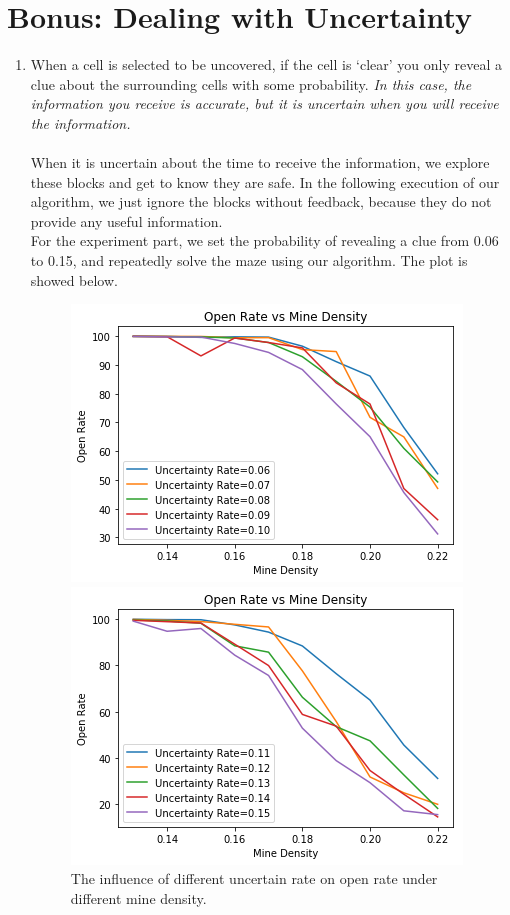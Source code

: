\documentclass[letter]{article}
\begin{document}
\section{Bonus: Dealing with Uncertainty}
\begin{enumerate}
	\label{zhichao2}
	\item {When a cell is selected to be uncovered, if the cell is ‘clear’ you only reveal a clue about the surrounding cells with some probability. \textit{In this case, the information you receive is accurate, but it is uncertain when you will receive the information.}} \\
	\\
	When it is uncertain about the time to receive the information, we explore these blocks and get to know they are safe. In the following execution of our algorithm, we just ignore the blocks without feedback, because they do not provide any useful information. \\
	For the experiment part, we set the probability of revealing a clue from 0.06 to 0.15, and repeatedly solve the maze using our algorithm. The plot is showed below.
	\begin{figure}[H]
		\includegraphics[width=\textwidth]{../pics/plt1.png}
		\caption{\label{fig:plt1} The influence of different uncertain rate on open rate under different mine density.}
		\endminipage\hfill
		\includegraphics[width=\textwidth]{../pics/plt2.png}

\end{figure}
\end{enumerate}
\end{document}
